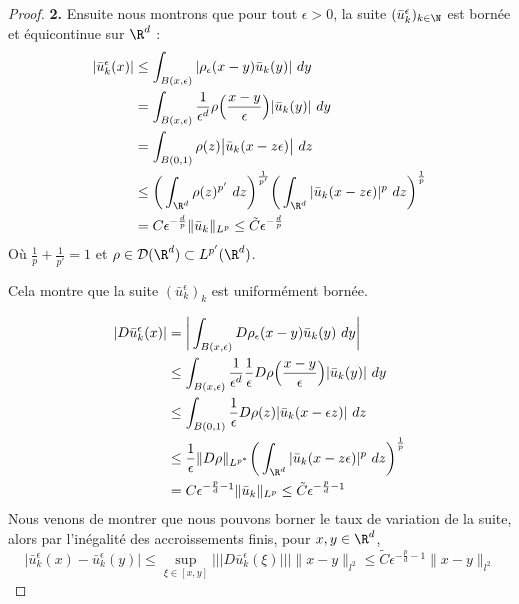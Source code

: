 \begin{proof}
    \vspace{1em}

    \textbf{2.}
    Ensuite nous montrons que pour tout $\epsilon > 0$, la suite $(\bar{u}_k^{\epsilon})_{k \in \N}$ est bornée et équicontinue sur $\R^d$ :
    \begin{equation*}
    \begin{split}
        |\bar{u}_k^{\epsilon}(x)| &\leq \int_{B(x,\epsilon)} |\rho_{\epsilon}(x - y)\bar{u}_k(y)| \ dy \\
        &= \int_{B(x,\epsilon)} \frac{1}{\epsilon^d} \rho\Big(\frac{x - y}{\epsilon}\Big) | \bar{u}_k(y)| \ dy \\
        &= \int_{B(0,1)} \rho(z) \big|\bar{u}_k(x - z\epsilon)\big| \ dz \\
        &\leq \bigg(\int_{\R^d} \rho(z)^{p'} \ dz\bigg)^{\frac{1}{p'}}\bigg( \int_{\R^d} |\bar{u}_k(x - z\epsilon)|^p \ dz \bigg)^{\frac{1}{p}} \\
        &= C \epsilon^{-\frac{d}{p}} \| \bar{u}_k \|_{L^p} \leq \tilde{C} \epsilon^{-\frac{d}{p}}
    \end{split}
    \end{equation*}
    Où $\frac{1}{p} + \frac{1}{p'} = 1$ et $\rho \in \mathcal{D}(\R^d) \subset L^{p'}(\R^d)$.

    Cela montre que la suite $(\bar{u}_k^{\epsilon})_k$ est uniformément bornée.

    \begin{equation*}
    \begin{split}
        |D\bar{u}_k^{\epsilon}(x)| &= \bigg| \int_{B(x,\epsilon)} D\rho_{\epsilon}(x - y)\bar{u}_k(y) \ dy \bigg| \\
        &\leq \int_{B(x,\epsilon)} \frac{1}{\epsilon^d} \frac{1}{\epsilon} D \rho\Big( \frac{x - y}{\epsilon} \Big) |\bar{u}_k(y)| \ dy \\
        &\leq \int_{B(0,1)}\frac{1}{\epsilon} D \rho(z) |\bar{u}_k(x - \epsilon z)| \ dz \\
        &\leq \frac{1}{\epsilon} \|D\rho\|_{L^{p^*}} \bigg( \int_{\R^d} |\bar{u}_k(x - z\epsilon)|^p \ dz \bigg)^{\frac{1}{p}} \\
        &= C \epsilon^{-\frac{p}{d} - 1} \| \bar{u}_k \|_{L^p} \leq \tilde{C} \epsilon^{-\frac{p}{d} - 1}
    \end{split}
    \end{equation*}
    Nous venons de montrer que nous pouvons borner le taux de variation de la suite, alors par l'inégalité des accroissements finis, pour $x,y \in \R^d$,
    $$|\bar{u}_k^{\epsilon}(x) - \bar{u}_k^{\epsilon}(y)| \leq \underset{\xi \in [x,y]}{\sup}\lvert\!\lvert\!\lvert D\bar{u}_k^{\epsilon}(\xi) \rvert\!\rvert\!\rvert \|x - y\|_{l^2} \leq \tilde{C}\epsilon^{-\frac{p}{d} - 1} \|x - y\|_{l^2} $$


\end{proof}

